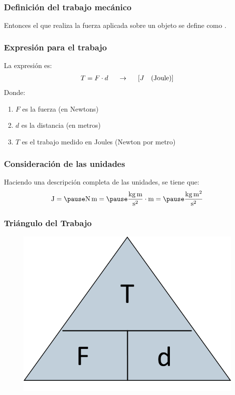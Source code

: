 \documentclass[14pt]{beamer}
\begin{document}
\begin{frame}
\frametitle{Definición del trabajo mecánico}
Entonces el  que realiza la fuerza aplicada sobre un objeto \pause se define como .
\end{frame}
\begin{frame}
\frametitle{Expresión para el trabajo}
\vspace*{-1cm}
La expresión es:
\begin{align*}
T = F \cdot d \hspace{0.5cm} \rightarrow \hspace{0.5cm} \left[ J \quad (\text{Joule}) \right]
\end{align*}
\pause
Donde:
\begin{enumerate}[<+->]
\item $F$ es la fuerza (en Newtons)
\item $d$ es la distancia (en metros)
\item $T$ es el trabajo medido en Joules (Newton por metro)
\end{enumerate}
\end{frame}
\begin{frame}
\frametitle{Consideración de las unidades}
Haciendo una descripción completa de las unidades, se tiene que:
\begin{eqnarray*}
\begin{aligned}
\si{\joule} = \pause \si{\newton\meter} = \pause \si[per-mode=fraction]{\kilo\gram\meter\per\square\second} \cdot \si\meter = \pause \si[per-mode=fraction]{\kilo\gram\square\meter\per\square\second}
\end{aligned}
\end{eqnarray*}
\end{frame}
\begin{frame}
\frametitle{Triángulo del Trabajo}
\begin{figure}
    \centering
    \includegraphics[scale=1]{Imagenes/Triangulo_Trabajo.png}
\end{figure}
\end{frame}
\end{document}
